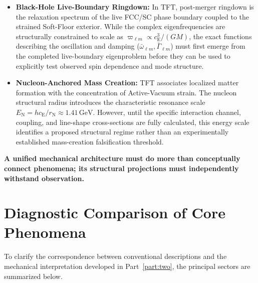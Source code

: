 \begin{itemize}
    \item \textbf{Black-Hole Live-Boundary Ringdown:} In TFT, post-merger ringdown is the relaxation spectrum of the live FCC/SC phase boundary coupled to the strained Soft-Floor exterior. While the complex eigenfrequencies are structurally constrained to scale as $\varpi_{\ell m} \propto c_{\mathrm E}^{3}/(GM)$, the exact functions describing the oscillation and damping ($\bar{\omega}_{\ell m}, \bar{\Gamma}_{\ell m}$) must first emerge from the completed live-boundary eigenproblem before they can be used to explicitly test observed spin dependence and mode structure.

    \item \textbf{Nucleon-Anchored Mass Creation:} TFT associates localized matter formation with the concentration of Active-Vacuum strain. The nucleon structural radius introduces the characteristic resonance scale $E_{\mathrm N} = h c_{\mathrm E}/r_{\mathrm N} \approx 1.41\,\mathrm{GeV}$. However, until the specific interaction channel, coupling, and line-shape cross-sections are fully calculated, this energy scale identifies a proposed structural regime rather than an experimentally established mass-creation falsification threshold.
\end{itemize}

\medskip
\noindent\textbf{A unified mechanical architecture must do more than conceptually connect phenomena; its structural projections must independently withstand observation.}

\section{Diagnostic Comparison of Core Phenomena}

To clarify the correspondence between conventional descriptions and the mechanical interpretation developed in Part~\ref{part:two}, the principal sectors are summarized below.

\vspace{0.5em}

\bgroup
\renewcommand{\arraystretch}{1.5}
\small
\setlength{\LTcapwidth}{\textwidth}

